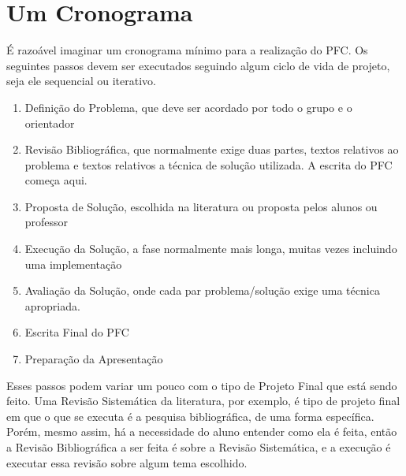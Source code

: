 \chapter{Um Cronograma}

É razoável imaginar um cronograma mínimo para a realização do PFC. Os seguintes passos devem ser executados seguindo algum ciclo de vida de projeto, seja ele sequencial ou iterativo.

\begin{enumerate}

\item Definição do Problema, que deve ser acordado por todo o grupo e o orientador

\item Revisão Bibliográfica, que normalmente exige duas partes, textos relativos ao problema e textos relativos a técnica de solução utilizada. A escrita do PFC começa aqui.

\item Proposta de Solução, escolhida na literatura ou proposta pelos alunos ou professor

\item Execução da Solução, a fase normalmente mais longa, muitas vezes incluindo uma implementação

\item Avaliação da Solução, onde cada par problema/solução exige uma técnica apropriada.

\item Escrita Final do PFC

\item Preparação da Apresentação

\end{enumerate}

Esses passos podem variar um pouco com o tipo de Projeto Final que está sendo feito. Uma Revisão Sistemática da literatura, por exemplo, é tipo de projeto final em que o que se executa é a pesquisa bibliográfica, de uma forma específica. Porém, mesmo assim, há a necessidade do aluno entender como ela é feita, então a Revisão Bibliográfica a ser feita é sobre a Revisão Sistemática, e a execução é executar essa revisão sobre algum tema escolhido.
